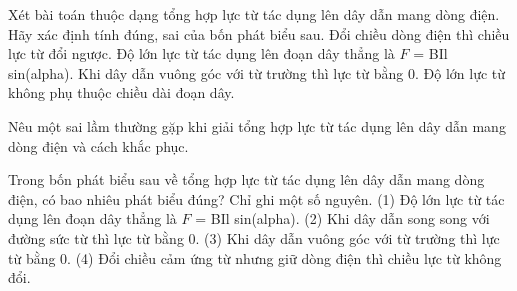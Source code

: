 \begin{ex}
Xét bài toán thuộc dạng tổng hợp lực từ tác dụng lên dây dẫn mang dòng điện. Hãy xác định tính đúng, sai của bốn phát biểu sau.
\choiceTF
{\True Đổi chiều dòng điện thì chiều lực từ đổi ngược.}
{\True Độ lớn lực từ tác dụng lên đoạn dây thẳng là $F$ = BIl sin(alpha).}
{Khi dây dẫn vuông góc với từ trường thì lực từ bằng 0.}
{Độ lớn lực từ không phụ thuộc chiều dài đoạn dây.}
\end{ex}

\begin{bt}
Nêu một sai lầm thường gặp khi giải tổng hợp lực từ tác dụng lên dây dẫn mang dòng điện và cách khắc phục.
\end{bt}

\begin{ex}
Trong bốn phát biểu sau về tổng hợp lực từ tác dụng lên dây dẫn mang dòng điện, có bao nhiêu phát biểu đúng? Chỉ ghi một số nguyên. (1) Độ lớn lực từ tác dụng lên đoạn dây thẳng là $F$ = BIl sin(alpha). (2) Khi dây dẫn song song với đường sức từ thì lực từ bằng 0. (3) Khi dây dẫn vuông góc với từ trường thì lực từ bằng 0. (4) Đổi chiều cảm ứng từ nhưng giữ dòng điện thì chiều lực từ không đổi.
\end{ex}


